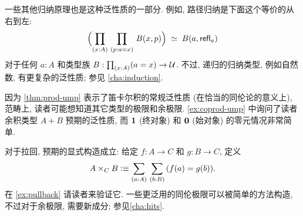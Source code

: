 一些其他归纳原理也是这种泛性质的一部分.
例如, 路径归纳是下面这个等价的从右到左:
%
%
\begin{equation}
    \label{eq:path-lump}
    \eqvspaced{\Parens{\prd{x:A}{p:a=x} B(x,p)}}{B(a,\refl a)}
\end{equation}
对于任何 $a:A$ 和类型族 $B:\prd{x:A} (a=x) \to\type$.
不过, 递归的归纳类型, 例如自然数, 有更复杂的泛性质; 参见 \cref{cha:induction}.

%
%
%
%
因为 \cref{thm:prod-ump} 表示了笛卡尔积的常规泛性质 (在恰当的同伦论的意义上), 范畴上, 读者可能想知道其它类型的极限和余极限.
\cref{ex:coprod-ump} 中询问了读者余积类型 $A+B$ 预期的泛性质, 而 $\mathbf{1}$ (终对象) 和 $\mathbf{0}$ (始对象) 的零元情况非常简单.
%
%
%
%

%
对于拉回, 预期的显式构造成立: 给定 $f:A\to C$ 和 $g:B\to C$, 定义
\begin{equation}
    A\times_C B \defeq \sm{a:A}{b:B} (f(a)=g(b)).\label{eq:defn-pullback}
\end{equation}
在 \cref{ex:pullback} 请读者来验证它.
一些更泛用的同伦极限可以被简单的方法构造, 不过对于余极限, 需要新成分; 参见\cref{cha:hits}.

%